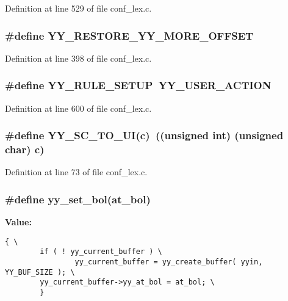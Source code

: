Definition at line 529 of file conf\_\-lex.c.
\subsubsection{\setlength{\rightskip}{0pt plus 5cm}\#define YY\_\-RESTORE\_\-YY\_\-MORE\_\-OFFSET}\label{conf__lex_8c_a35}




Definition at line 398 of file conf\_\-lex.c.
\subsubsection{\setlength{\rightskip}{0pt plus 5cm}\#define YY\_\-RULE\_\-SETUP\ YY\_\-USER\_\-ACTION}\label{conf__lex_8c_a60}




Definition at line 600 of file conf\_\-lex.c.
\subsubsection{\setlength{\rightskip}{0pt plus 5cm}\#define YY\_\-SC\_\-TO\_\-UI(c)\ ((unsigned int) (unsigned char) c)}\label{conf__lex_8c_a6}




Definition at line 73 of file conf\_\-lex.c.
\subsubsection{\setlength{\rightskip}{0pt plus 5cm}\#define yy\_\-set\_\-bol(at\_\-bol)}\label{conf__lex_8c_a26}


{\bf Value:}

\footnotesize\begin{verbatim}{ \
        if ( ! yy_current_buffer ) \
                yy_current_buffer = yy_create_buffer( yyin, YY_BUF_SIZE ); \
        yy_current_buffer->yy_at_bol = at_bol; \
        }
\end{verbatim}\normalsize 


